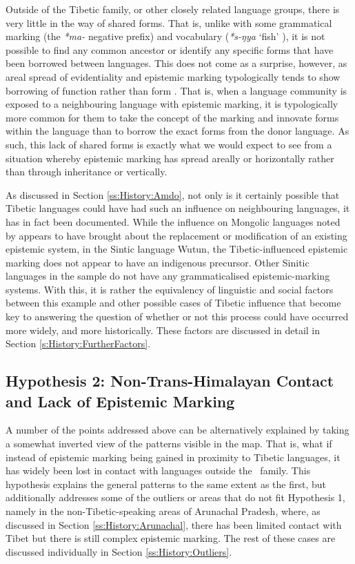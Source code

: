 Outside of the Tibetic family, or other closely related language groups, there is very little in the way of shared forms. That is, unlike with some grammatical marking (the \textit{*ma-} negative prefix) and vocabulary (\textit{*s-ŋya} `fish' \cite{STEDT}), it is not possible to find any common ancestor or identify any specific forms that have been borrowed between languages. This does not come as a surprise, however, as areal spread of evidentiality and epistemic marking typologically tends to show borrowing of function rather than form \cite{Aikhenvald2004}. That is, when a language community is exposed to a neighbouring language with epistemic marking, it is typologically more common for them to take the concept of the marking and innovate forms within the language than to borrow the exact forms from the donor language. As such, this lack of shared forms is exactly what we would expect to see from a situation whereby epistemic marking has spread areally or horizontally rather than through inheritance or vertically.

As discussed in Section \ref{ss:History:Amdo}, not only is it certainly possible that Tibetic languages could have had such an influence on neighbouring languages, it has in fact been documented. While the influence on Mongolic languages noted by  appears to have brought about the replacement or modification of an existing epistemic system, in the Sintic language Wutun, the Tibetic-influenced epistemic marking does not appear to have an indigenous precursor. Other Sinitic languages in the sample do not have any grammaticalised epistemic-marking systems. With this, it is rather the equivalency of linguistic and social factors between this example and other possible cases of Tibetic influence that become key to answering the question of whether or not this process could have occurred more widely, and more historically. These factors are discussed in detail in Section \ref{s:History:FurtherFactors}.

\subsection{Hypothesis 2: Non-Trans-Himalayan Contact and Lack of Epistemic Marking}
A number of the points addressed above can be alternatively explained by taking a somewhat inverted view of the patterns visible in the map. That is, what if instead of epistemic marking being gained in proximity to Tibetic languages, it has widely been lost in contact with languages outside the \lfam\ family. This hypothesis explains the general patterns to the same extent as the first, but additionally addresses some of the outliers or areas that do not fit Hypothesis 1, namely in the non-Tibetic-speaking areas of Arunachal Pradesh, where, as discussed in Section \ref{ss:History:Arunachal}, there has been limited contact with Tibet but there is still complex epistemic marking. The rest of these cases are discussed individually in Section \ref{ss:History:Outliers}.

